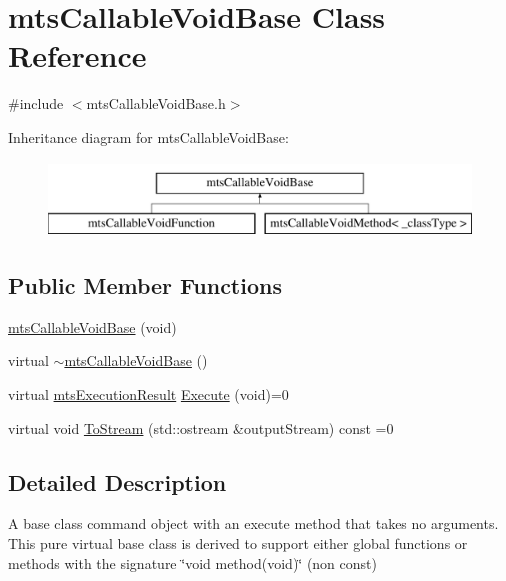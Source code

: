 \hypertarget{classmts_callable_void_base}{\section{mts\-Callable\-Void\-Base Class Reference}
\label{classmts_callable_void_base}
}


{\ttfamily \#include $<$mts\-Callable\-Void\-Base.\-h$>$}

Inheritance diagram for mts\-Callable\-Void\-Base\-:\begin{figure}[H]
\begin{center}
\leavevmode
\includegraphics[height=2.000000cm]{d5/dec/classmts_callable_void_base}
\end{center}
\end{figure}
\subsection*{Public Member Functions}
\begin{DoxyCompactItemize}
\item 
\hyperlink{classmts_callable_void_base_a442904860e8544aa4fccd3b9d05fef46}{mts\-Callable\-Void\-Base} (void)
\item 
virtual \hyperlink{classmts_callable_void_base_ae730a7775e63ed730fa0f3fe15202e9c}{$\sim$mts\-Callable\-Void\-Base} ()
\item 
virtual \hyperlink{classmts_execution_result}{mts\-Execution\-Result} \hyperlink{classmts_callable_void_base_a4db041f05ff4a394b88ef53f76ffa86c}{Execute} (void)=0
\item 
virtual void \hyperlink{classmts_callable_void_base_aca49f7ddbc0b2a1d79a78558dc1114b2}{To\-Stream} (std\-::ostream \&output\-Stream) const =0
\end{DoxyCompactItemize}


\subsection{Detailed Description}
A base class command object with an execute method that takes no arguments. This pure virtual base class is derived to support either global functions or methods with the signature \char`\"{}void
method(void)\char`\"{} (non const) 

